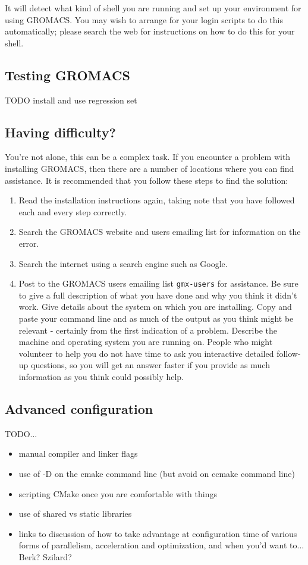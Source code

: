 \documentclass{article}[12pt,a4paper,twoside]
\newcommand{\gromacs}{GROMACS}
\newcommand{\cmake}{CMake}
\begin{document}
It will detect what kind of shell you are running and
set up your environment for using \gromacs{}. You may wish to arrange
for your login scripts to do this automatically; please search the web
for instructions on how to do this for your shell.

\subsection{Testing \gromacs{}}
TODO install and use regression set

\subsection{Having difficulty?}

You're not alone, this can be a complex task. If you encounter a
problem with installing GROMACS, then there are a number of locations
where you can find assistance. It is recommended that you follow these
steps to find the solution:

\begin{enumerate}
\item Read the installation instructions again, taking note that you
  have followed each and every step correctly.
\item Search the \gromacs{} website and users emailing list for information on the error.
\item Search the internet using a search engine such as Google.
\item Post to the \gromacs{} users emailing list \texttt{gmx-users} for
  assistance. Be sure to give a full description of what you have done
  and why you think it didn't work. Give details about the system on
  which you are installing. Copy and paste your command line and as
  much of the output as you think might be relevant - certainly from
  the first indication of a problem. Describe the machine and
  operating system you are running on. People who might volunteer to
  help you do not have time to ask you interactive detailed follow-up
  questions, so you will get an answer faster if you provide as much
  information as you think could possibly help.
\end{enumerate}

\subsection{Advanced configuration}

TODO...
\begin{itemize}
\item manual compiler and linker flags
\item use of -D on the cmake command line (but avoid on ccmake command
line)
\item scripting \cmake{} once you are comfortable with things
\item use of shared vs static libraries
\item links to discussion of how to take advantage at configuration
  time of various forms of parallelism, acceleration and optimization,
  and when you'd want to... Berk? Szilard?
\end{itemize}
\end{document}
